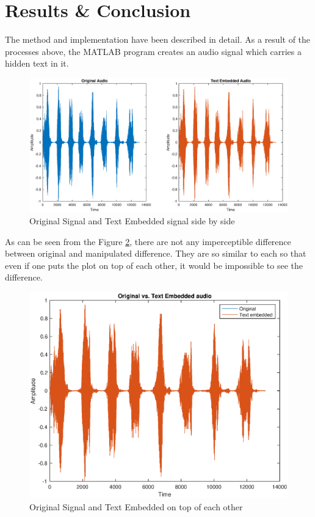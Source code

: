 \documentclass[twocolumns]{IEEEtran}
\begin{document}
	\section{Results \& Conclusion}
	
	The method and implementation have been described in detail. As a result of the processes above, the MATLAB program creates an audio signal which carries a hidden text in it.
	\begin{figure}[h]
		\centering
		\includegraphics[scale=.32]{orig_vs_hidden.eps}
		\caption{Original Signal and Text Embedded signal side by side}
		\label{fig:versus}
	\end{figure}
	As can be seen from the Figure \ref{fig:versus}, there are not any imperceptible difference between original and manipulated difference. They are so similar to each so that even if one puts the plot on top of each other, it would be impossible to see the difference.
		\begin{figure}[h]
		\centering
		\includegraphics[scale=.5]{combined.eps}
		\caption{Original Signal and Text Embedded on top of each other}
		\label{fig:versus}
	\end{figure}
\end{document}

